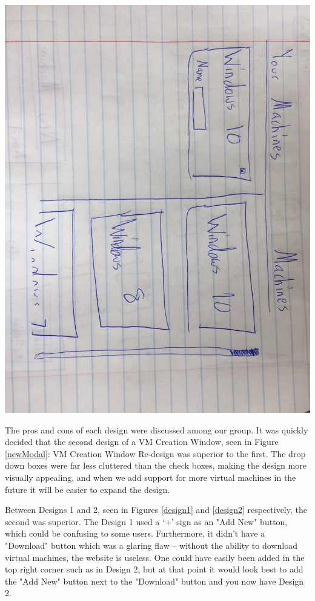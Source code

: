 \documentclass[openright]{report}
\begin{document}
\begin{center}
    \includegraphics[scale=0.24]{images/design3.JPG}
\end{center}

\par The pros and cons of each design were discussed among our group. It was quickly decided that the second design of a VM Creation Window, seen in Figure \ref{newModal}: VM Creation Window Re-design was superior to the first. The drop down boxes were far less cluttered than the check boxes, making the design more visually appealing, and when we add support for more virtual machines in the future it will be easier to expand the design.

\par Between Designs 1 and 2, seen in Figures \ref{design1} and \ref{design2} respectively, the second was superior. The Design 1 used a `+' sign as an "Add New" button, which could be confusing to some users. Furthermore, it didn't have a "Download" button which was a glaring flaw -- without the ability to download virtual machines, the website is useless. One could have easily been added in the top right corner such as in Design 2, but at that point it would look best to add the "Add New" button next to the "Download" button and you now have Design 2.
\end{document}

